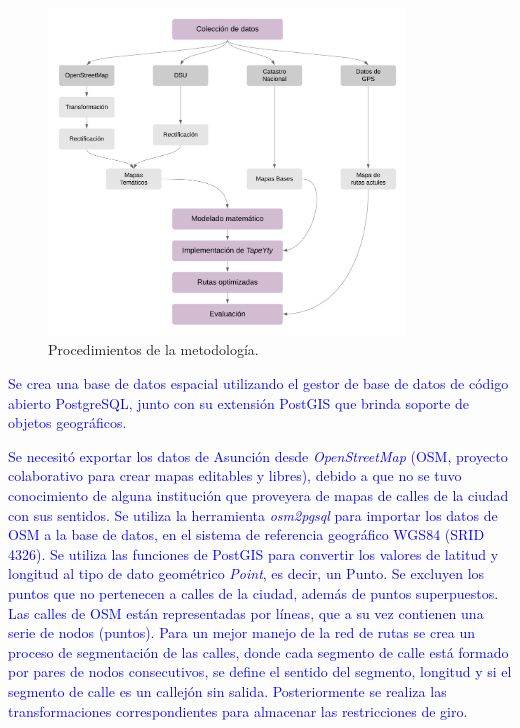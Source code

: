 \documentclass[spanish, conference]{IEEEtran}
\begin{document}
{\begin{figure}[htbp]
\centerline{\includegraphics[width=9.5cm]{imagenes/DiagramaDeMetodologia.png}}
\caption{Procedimientos de la metodología.}
\label{fig:metodologia}
\end{figure}

\textcolor{blue}{Se crea una base de datos espacial utilizando el gestor de base de datos de código abierto PostgreSQL, junto con su extensión PostGIS que brinda soporte de objetos geográficos. }


\textcolor{blue}{Se necesitó exportar los datos de Asunción desde \textit{OpenStreetMap} (OSM, proyecto colaborativo para crear mapas editables y libres), debido a que no se tuvo conocimiento de alguna institución que proveyera de mapas de calles de la ciudad con sus sentidos. Se utiliza la herramienta \textit{osm2pgsql} para importar los datos de OSM a la base de datos, en el sistema de referencia geográfico WGS84 (SRID 4326). Se utiliza las funciones de PostGIS para convertir los valores de latitud y longitud al tipo de dato geométrico \textit{Point}, es decir, un Punto. Se excluyen los puntos que no pertenecen a calles de la ciudad, además de puntos superpuestos. Las calles de OSM están representadas por líneas, que a su vez contienen una serie de nodos (puntos). Para un mejor manejo de la red de rutas se crea un proceso de segmentación de las calles, donde cada segmento de calle está formado por pares de nodos consecutivos, se define el sentido del segmento, longitud y si el segmento de calle es un callejón sin salida. Posteriormente se realiza las transformaciones correspondientes para almacenar las restricciones de giro.}

}
\end{document}
